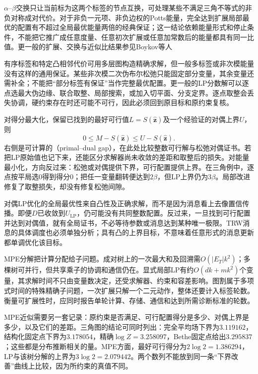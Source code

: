 $\alpha$--$\beta$交换只让当前标为这两个标签的节点互换，可处理某些不满足三角不等式的非负对称成对代价。对于非负一元项、非负边权的Potts能量，完全达到扩展局部最优的配置有不超过全局最优能量两倍的经典保证；这一结论依赖能量形式和停止条件，不能把它推广成任意度量、任意初次扩展或任意加常数后的能量都具有同一比值。更一般的扩展、交换与近似比结果参见Boykov等人

有序标签和特定凸相邻代价可用多层图构造精确求解，但一般多标签或非次模能量没有这样的通用保证。某些非次模二次伪布尔松弛只能固定部分变量，其余变量还需补全；不能把“部分标签有保证”当作完整最优配置。更一般的LP分数解可以逐点选最大伪边缘、联合取整、局部搜索，或加入切平面、分支定界。逐点取整会丢失协调，硬约束存在时还可能不可行，因此必须回到原目标和原约束复核。

对得分最大化，保留已找到的最好可行值$L=S(\widehat{\bm z})$及一个经验证的对偶上界$U$，则
\begin{equation}
  0\leq M-S(\widehat{\bm z})\leq U-S(\widehat{\bm z}).
  \label{eq:pgm-variational-gap}
\end{equation}
右侧是可计算的（primal--dual gap），在此处比较整数可行解与松弛对偶证书。若把LP原始值也记下来，还能区分求解器尚未收敛的差距和取整后的损失。对能量最小化，方向反过来：松弛或对偶提供下界，可行配置提供上界。在三角例中，逐点按平局选$0$得到得分$0$；把任一变量翻转便达到$2\beta$，但LP上界仍为$3\beta$。局部改进修复了取整损失，却没有修复松弛间隙。

对偶LP优化的全局最优性来自凸性及正确求解，而不是因为消息看上去像置信传播。即便$D$已收敛到$U_{\mathrm{LP}}$，仍可能没有共同整数配置。反过来，一旦找到可行配置并达到对偶值，就有全局证书，不必等待参数或消息达到某种唯一极限。TRW消息的具体调度也必须单独分析；具有凸的上界目标，不意味着任意形式的消息更新都单调优化该目标。

MPE分解把计算分配给子问题。成对树上的一次最大和及回溯需$O(|E_T|k^2)$；多棵树可并行，但共享乘子的协调和通信仍在。显式局部LP有约$O(dk+mk^2)$个变量，其求解时间不只由变量数决定，还受求解器、约束和容差影响。图割属于多项式时间的特殊精确子问题，一次扩展只解一个二元动作，整体还要计入标签轮数。衡量可扩展性时，应同时报告单轮计算、存储、通信和达到所需诊断标准的轮数。

MPE近似需要另一套记录：原约束是否满足、可行配置得分是多少、对偶上界是多少，以及它们的差距。三角图的结论可同时列出：完全平均场下界为$3.119162$，结构化固定点下界为$3.178054$，精确$\log Z=3.258097$，Bethe固定点给出$3.295837$；这些都是分布推断相关的量。MPE方面，最好可行得分为$2\log2=1.386294$，LP与该树分解的上界为$3\log2=2.079442$。两个数列不能放到同一条“下界改善”曲线上比较，因为所约束的真值不同。

